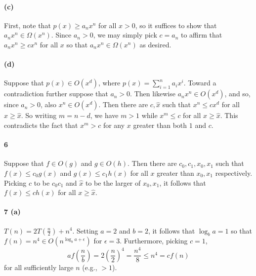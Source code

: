 \documentclass[
]{article}
\begin{document}
\hypertarget{c-2}{%
\paragraph{(c)}\label{c-2}}

First, note that \(p(x)\geq a_nx^{n}\) for all \(x>0\), so it suffices to
show that \(a_nx^{n}\in \Omega(x^n)\). Since \(a_n>0\), we may simply
pick \(c=a_n\) to affirm that \(a_nx^n \geq cx^n\) for all \(x\) so that
\(a_nx^n\in \Omega(x^n)\) as desired.

\hypertarget{d-2}{%
\paragraph{(d)}\label{d-2}}

Suppose that \(p(x)\in O(x^d)\), where \(p(x) = \sum_{i=1}^na_ix^i\).
Toward a contradiction further suppose that \(a_n>0\). Then likewise
\(a_nx^n\in O(x^d)\), and so, since \(a_n>0\), also \(x^n\in O(x^d)\).
Then there are \(c, \hat x\) such that \(x^n \leq cx^d\) for all
\(x\geq\hat x\). So writing \(m=n-d\), we have \(m>1\) while
\(x^m \leq c\) for all \(x\geq \hat x\). This contradicts the fact that
\(x^m > c\) for any \(x\) greater than both \(1\) and \(c\).

\hypertarget{section-1}{%
\paragraph{6}\label{section-1}}

Suppose that \(f\in O(g)\) and \(g\in O(h)\). Then there are
\(c_0,c_1,x_0, x_1\) such that \(f(x)\leq c_0g(x)\) and
\(g(x)\leq c_1h(x)\) for all \(x\) greater than \(x_0,x_1\)
respectively. Picking \(c\) to be \(c_0c_1\) and \(\hat x\) to be the
larger of \(x_0,x_1\), it follows that \(f(x)\leq ch(x)\) for all
\(x\geq \hat x\).

\hypertarget{a-4}{%
\paragraph{7 (a)}\label{a-4}}

\(T(n) = 2T(\frac{n}{2}) + n^4\). Setting \(a=2\) and \(b=2\), it
follows that \(\log_b a = 1\) so that
\(f(n) = n^4\in O(n^{\log_b a + \epsilon})\) for \(\epsilon=3\).
Furthermore, picking \(c=1\), \begin{equation*}
af\left(\frac{n}{b}\right) = 2\left(\frac{n}{2}\right)^4 = \frac{n^4}{8}\leq n^4 = cf(n)  
\end{equation*} for all sufficiently large \(n\) (e.g., \(>1\)).
\end{document}
